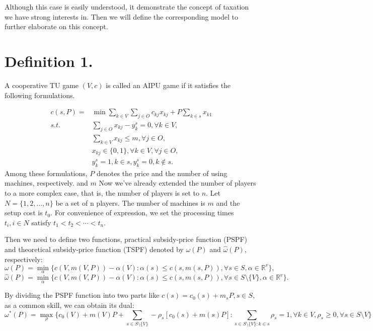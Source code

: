 \documentclass[UTF8]{article}
\begin{document}
Although this case is easily understood, it demonstrate the concept of taxation we have strong interests in. Then we will define the corresponding model to further elaborate on this concept.

\section*{Definition 1.}

A cooperative TU game $(V,c)$ is called an AIPU game if it satisfies the following formulations.

\[
\begin{aligned}
c(s,P) = & {\min} \sum_{k\in V}\sum_{j\in O} {c_{kj} x_{kj}} + {P\sum_{k\in s} x_{k1}} \\
{s.t.}\quad & \sum_{j \in O} x_{kj}-y_k^s=0, \forall k \in V, \\
& \sum_{k\in V} x_{kj} \leq m,\forall j \in O,  \\
& x_{kj} \in \{0,1\} , \forall k \in V, \forall j \in O,\\
& y_k^s=1, k \in s, y_k^s=0, k \notin s.
\end{aligned}
\]
Among these formulations, $P$ denotes the price and the number of using machines, respectively. and $m$
Now we've already extended the number of players to a more complex case, that is, the number of players is set to $n$.
Let $N=\{1,2,\ldots,n\}$ be a set of n players. The number of machines is $m$ and the setup cost is $t_0$.
For convenience of expression, we set the processing times $t_i, i\in N$ satisfy $t_1<t_2<\cdots<t_n$.

Then we need to define two functions, practical subsidy-price function (PSPF) and theoretical subsidy-price function (TSPF) denoted by $\omega(P)$ and $\hat{\omega}(P)$, respectively:
\[
  {\omega(P)}=\mathop{\min}_{\alpha}\{c(V,m(V,P))-\alpha(V): \alpha(s)\leq c(s,m(s,P))
 ,\forall s \in S, \alpha\in\mathbb{R}^{v}\},
\]
\[
  {\hat{\omega}(P)}=\mathop{\min}_{\alpha}\{c(V,m(V,P))-\alpha(V): \alpha(s)\leq c(s,m(s,P))
 ,\forall s \in S\setminus\{V\}, \alpha\in\mathbb{R}^{v}\}.
\]

By dividing the PSPF function into two parts like $c(s)=c_0(s)+m_sP, s \in S$, as a common skill, we can obtain its dual:
\begin{equation}\label{dual}
 {\omega^*(P)}=\mathop{\max}_{\rho} \{c_0(V)+m(V)P+\sum_{s\in S\setminus\{V\}}-\rho_s[c_0(s)+m(s)P]:
 \sum_{s\in S\setminus\{V\}:k\in s}\rho_s=1,\forall k \in V,\rho_s\geq 0,\forall s \in S \setminus{V}\}
\end{equation}
\end{document}
